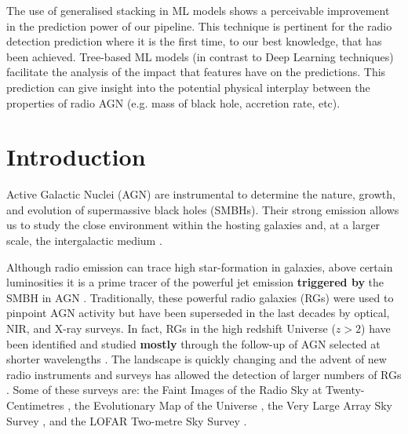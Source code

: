 \documentclass{aa}
\begin{document}
   {The use of generalised stacking in ML models shows a perceivable improvement in the prediction power of our pipeline. This technique is pertinent for the radio detection prediction where it is the first time, to our best knowledge, that has been achieved. Tree-based ML models (in contrast to Deep Learning techniques) facilitate the analysis of the impact that features have on the predictions. This prediction can give insight into the potential physical interplay between the properties of radio AGN (e.g. mass of black hole, accretion rate, etc).}


   \maketitle
%

\section{Introduction}\label{sec:introduction}

Active Galactic Nuclei (AGN) are instrumental to determine the nature, growth, and evolution of supermassive black holes (SMBHs). Their strong emission allows us to study the close environment within the hosting galaxies and, at a larger scale, the intergalactic medium \citep[e.g.][]{2017A&ARv..25....2P, 2022MNRAS.516.5775B}.

Although radio emission can trace high star-formation in galaxies, above certain luminosities \citep[e.g. $\mathrm{log}L_{1.4\mathrm{GHz}} {>} 25\,\mathrm{W\, Hz^{-1}}$,][]{2021MNRAS.503.1780J} it is a prime tracer of the powerful jet emission \textbf{triggered by} the SMBH in AGN \citep[Radio Galaxies,][]{2014ARA&A..52..589H}. Traditionally, these powerful radio galaxies (RGs) were used to pinpoint AGN activity but have been superseded in the last decades by optical, NIR, and X-ray surveys. In fact, RGs in the high redshift Universe ($z > 2$) have been identified and studied \textbf{mostly} through the follow-up of AGN selected at shorter wavelengths \citep[optical, NIR, millimetre, and X-rays, e.g.][]{2006ApJ...652..157M, 2020A&A...637A..84P, 2021MNRAS.501.3833D}.
The landscape is quickly changing and the advent of new radio instruments and surveys has allowed the detection of larger numbers of RGs \citep[e.g.][]{2018MNRAS.475.3429W, 2020A&A...642A.107C}. Some of these surveys are: the Faint Images of the Radio Sky at Twenty-Centimetres \citep[FIRST;][]{2015ApJ...801...26H}, the Evolutionary Map of the Universe \citep[EMU;][]{2011PASA...28..215N}, the Very Large Array Sky Survey \citep[VLASS;][]{2020RNAAS...4..175G}, and the LOFAR Two-metre Sky Survey \citep[LoTSS;][]{2019A&A...622A...1S}. 
\end{document}
